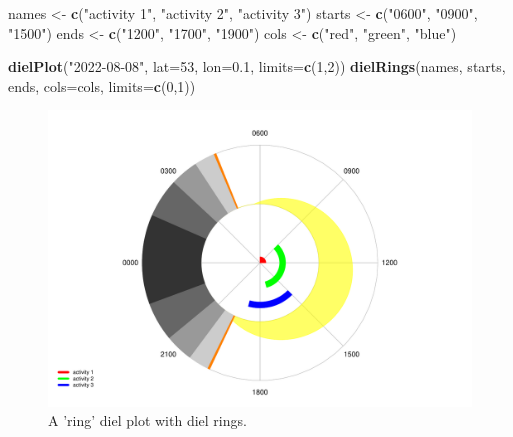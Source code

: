 \documentclass[
]{book}
\newenvironment{Shaded}{\begin{snugshade}}{\end{snugshade}}
\newcommand{\AttributeTok}[1]{\textcolor[rgb]{0.13,0.29,0.53}{#1}}
\newcommand{\DecValTok}[1]{\textcolor[rgb]{0.00,0.00,0.81}{#1}}
\newcommand{\FloatTok}[1]{\textcolor[rgb]{0.00,0.00,0.81}{#1}}
\newcommand{\FunctionTok}[1]{\textcolor[rgb]{0.13,0.29,0.53}{\textbf{#1}}}
\newcommand{\NormalTok}[1]{#1}
\newcommand{\OtherTok}[1]{\textcolor[rgb]{0.56,0.35,0.01}{#1}}
\newcommand{\StringTok}[1]{\textcolor[rgb]{0.31,0.60,0.02}{#1}}
\begin{document}
\begin{Shaded}
\begin{Highlighting}[]
\NormalTok{names }\OtherTok{\textless{}{-}} \FunctionTok{c}\NormalTok{(}\StringTok{"activity 1"}\NormalTok{, }\StringTok{"activity 2"}\NormalTok{, }\StringTok{"activity 3"}\NormalTok{)}
\NormalTok{starts }\OtherTok{\textless{}{-}} \FunctionTok{c}\NormalTok{(}\StringTok{"0600"}\NormalTok{, }\StringTok{"0900"}\NormalTok{, }\StringTok{"1500"}\NormalTok{)}
\NormalTok{ends }\OtherTok{\textless{}{-}} \FunctionTok{c}\NormalTok{(}\StringTok{"1200"}\NormalTok{, }\StringTok{"1700"}\NormalTok{, }\StringTok{"1900"}\NormalTok{)}
\NormalTok{cols }\OtherTok{\textless{}{-}} \FunctionTok{c}\NormalTok{(}\StringTok{"red"}\NormalTok{, }\StringTok{"green"}\NormalTok{, }\StringTok{"blue"}\NormalTok{)}

\FunctionTok{dielPlot}\NormalTok{(}\StringTok{"2022{-}08{-}08"}\NormalTok{, }\AttributeTok{lat=}\DecValTok{53}\NormalTok{, }\AttributeTok{lon=}\FloatTok{0.1}\NormalTok{, }\AttributeTok{limits=}\FunctionTok{c}\NormalTok{(}\DecValTok{1}\NormalTok{,}\DecValTok{2}\NormalTok{))}
\FunctionTok{dielRings}\NormalTok{(names, starts, ends, }\AttributeTok{cols=}\NormalTok{cols, }\AttributeTok{limits=}\FunctionTok{c}\NormalTok{(}\DecValTok{0}\NormalTok{,}\DecValTok{1}\NormalTok{))}
\end{Highlighting}
\end{Shaded}

\begin{figure}

{\centering \includegraphics[width=0.9\linewidth]{_main_files/figure-latex/diel-plot-rings-2-1} 

}

\caption{A 'ring' diel plot with diel rings.}\label{fig:diel-plot-rings-2}
\end{figure}
\end{document}
